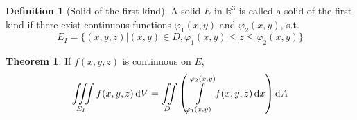 \documentclass[fleqn, a4paper, 12pt]{article}
\theoremstyle{definition}
\newtheorem{definition}{Definition}
\theoremstyle{theorem}
\newtheorem{theorem}{Theorem}
\theoremstyle{remark}
\begin{document}
\begin{definition}[Solid of the first kind]
	A solid $E$ in $\mathbb{R}^3$ is called a solid of the first kind if there exist continuous functions $\varphi_1(x,y)$ and $\varphi_2(x,y)$, s.t.
	\begin{equation*}
		E_{I} = \{(x,y,z) | (x,y) \in D, \varphi_1(x,y) \leq z \leq \varphi_2(x,y)\}
	\end{equation*}
\end{definition}

\begin{theorem}
	If $f(x,y,z)$ is continuous on $E$,
	\begin{equation*}
		\iiint\limits_{E_{I}} f(x,y,z) \dif V = \iint\limits_{D} \left( \int\limits_{\varphi_1(x,y)}^{\varphi_2(x,y)} f(x,y,z) \dif x \right) \dif A
	\end{equation*}
\end{theorem}
\end{document}
